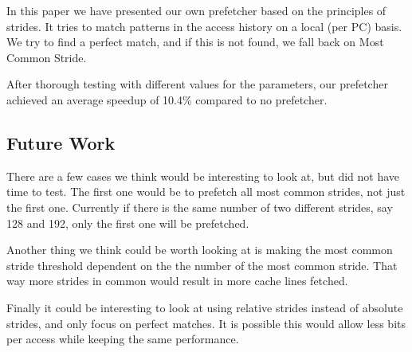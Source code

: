 In this paper we have presented our own prefetcher based on the principles of
strides. It tries to match patterns in the access history on a local (per PC)
basis. We try to find a perfect match, and if this is not found, we fall back
on Most Common Stride.

After thorough testing with different values for the parameters, our prefetcher
achieved an average speedup of 10.4\% compared to no prefetcher.

\subsection{Future Work}
There are a few cases we think would be interesting to look at, but did not have
time to test. The first one would be to prefetch all most common strides, not
just the first one. Currently if there is the same number of two different
strides, say 128 and 192, only the first one will be prefetched.

Another thing we think could be worth looking at is making the most common
stride threshold dependent on the the number of the most common stride.
That way more strides in common would result in more cache lines fetched.

Finally it could be interesting to look at using relative strides instead of
absolute strides, and only focus on perfect matches. It is possible this would
allow less bits per access while keeping the same performance.
\balance
